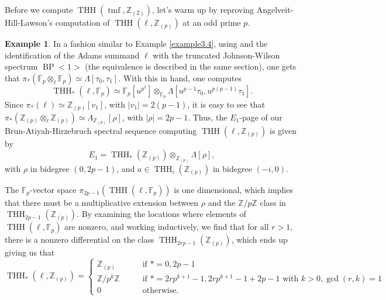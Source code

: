 \documentclass[11pt,leqno]{article}
\newcommand{\zz}{\mathbb{Z}}
\newcommand{\fff}{\mathbb{F}}
\DeclareMathOperator{\THH}{THH}
\DeclareMathOperator{\tmf}{tmf}
\newcommand{\mo}[1]{\operatorname{#1}}
\newtheorem*{short hand}{theorem name}
\theoremstyle{plain}  %
\theoremstyle{definition}
\newtheorem{example}{Example}[section]
\numberwithin{equation}{section}
\begin{document}
Before we compute $\THH(\tmf,\zz_{(2)})$, let's warm up by reproving Angelveit-Hill-Lawson's \cite{angeltveit2009topological} computation of $\THH(\ell,\zz_{(p)})$ at an odd prime $p$.
\begin{example}\label{ex3.5}  In a fashion similar to Example \ref{example3.4}, using \cite[~]{1986119} and the identification of the Adams summand $\ell$ with the truncated Johnson-Wilson spectrum $\mo{BP}<1>$ (the equivalence is described in the same section), one gets that $\pi_*(\fff_p\otimes_{\ell}\fff_p)\simeq \Lambda[\tau_0,\tau_1]$.  With this in hand, one computes
	$$\THH_*(\ell,\fff_{p})\simeq \fff_p[u^{p^2}]\otimes_{\fff_p}\Lambda[u^{p-1}\tau_0,u^{p(p-1)}\tau_1].$$ 
	 Since $\pi_*(\ell)\simeq \zz_{(p)}[v_1]$, with $|v_1|=2(p-1)$, it is easy to see that $\pi_*(\zz_{(p)}\otimes_{\ell}\zz_{(p)})\simeq \Lambda_{\zz_{(p)}}[\rho]$, with $|\rho|=2p-1$.  Thus, the $E_1$-page of our Brun-Atiyah-Hirzebruch spectral sequence computing $\THH(\ell,\zz_{(p)})$ is given by $$E_{1}=\THH_*(\zz_{(p)})\otimes_{\zz_{(p)}} \Lambda[\rho],$$ with $\rho$ in bidegree $(0,2p-1)$, and $a\in\THH_i(\zz_{(p)})$ in bidegree $(-i,0)$. 
	 
The $\fff_p$-vector space $\pi_{2p-1}(\THH(\ell,\fff_p))$ is one dimensional, which implies that there must be a multiplicative extension between $\rho$ and the $\zz/p\zz$ class in $\THH_{2p-1}(\zz_{(p)})$.  By examining the locations where elements of $\THH(\ell,\fff_p)$ are nonzero, and working inductively, we find that for all $r>1$, there is a nonzero differential on the class $\THH_{2rp-1}(\zz_{(p)})$, which ends up giving us that 
 $$\THH_*(\ell,\zz_{(p)})=\begin{cases}
 	\zz_{(p)}  &\qquad \text{if } *=0, 2p-1\\
 	\zz/p^k\zz &\qquad \text{if } *=2rp^{k+1}-1, 2rp^{k+1}-1+2p-1 \text{ with } k>0, \gcd(r,k)=1\\
 	0 & \qquad \text{otherwise}.
 \end{cases}$$
\end{example}
\end{document}
